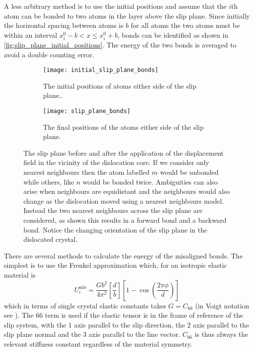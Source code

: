 A less arbitrary method is to use the initial positions and assume that the $i$th atom can be bonded to two atoms in the layer above the slip plane. Since initially the horizontal spacing between atoms is $b$ for all atoms the two atoms must be within an interval $x_i^0 - b < x \leq x_i^0 + b$, bonds can be identified as shown in \autoref{fig:slip_plane_initial_positions}. The energy of the two bonds is averaged to avoid a double counting error.

\begin{figure}
\centering
\begin{subfigure}{\textwidth}
\centering
\texttt{[image: initial\_slip\_plane\_bonds]}
\caption{The initial positions of atoms either side of the slip plane.\label{fig:slip_plane_initial_positions}.}
\end{subfigure}
\par\medskip
\begin{subfigure}{\textwidth}
\texttt{[image: slip\_plane\_bonds]}
\caption{The final positions of the atoms either side of the slip plane.\label{fig:slip_plane_final_positions}}
\end{subfigure}
\caption[Misaligned bonds across the slip plane.]{The slip plane before and after the application of the displacement field in the vicinity of the dislocation core. If we consider only nearest neighbours then the atom labelled $m$ would be unbonded while others, like $n$ would be bonded twice. Ambiguities can also arise when neighbours are equidistant and the neighbours would also change as the dislocation moved using a nearest neighbours model. Instead the two nearest neighbours across the slip plane are considered, as shown this results in a forward bond and a backward bond. Notice the changing orientation of the slip plane in the dislocated crystal.\label{fig:slip_plane}}
\end{figure}


There are several methods to calculate the energy of the misaligned bonds. The simplest is to use the Frenkel approximation which, for an isotropic elastic material is 
\begin{equation}
U_i^\text{mis} = \frac{Gb^2}{4\pi^2} \left[\frac{d}{b}\right] \left[ 1 - \cos \left( \frac{2 \pi \phi}{d} \right) \right]
\end{equation}
which in terms of single crystal elastic constants takes $G=C_{66}$ (in Voigt notation see \cite{kelly_knowles2012chapter6_stress_strain}). The $66$ term is used if the elastic tensor is in the frame of reference of  the slip system, with the $1$ axis parallel to the slip direction, the $2$ axis parallel to the slip plane normal and the $3$ axis parallel to the line vector. $C_{66}$ is thus always the relevant stiffness constant regardless of the material symmetry.

